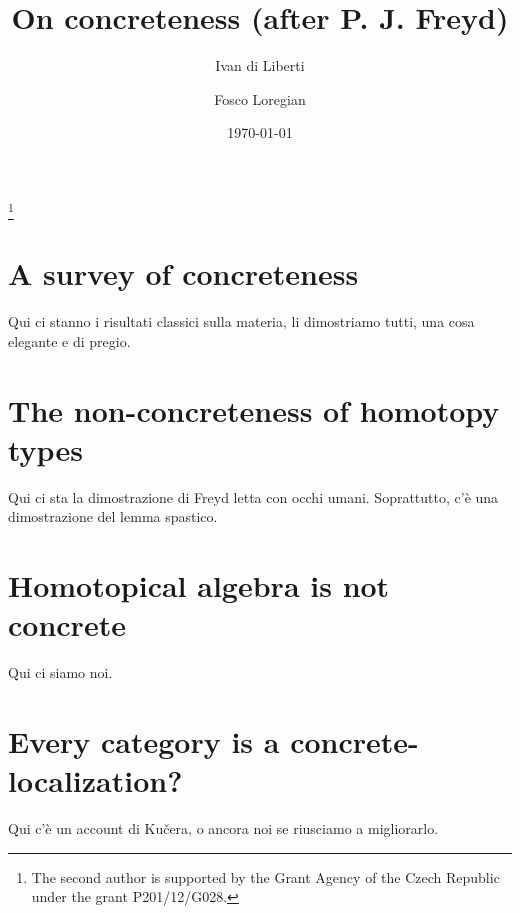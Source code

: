 \documentclass[a4paper,11pt]{amsart}
\begin{document}
\title{On concreteness (after P\@. J\@. Freyd)}

\author{Ivan di Liberti}
\address{%
$^\dag$Department of Mathematics and Statistics\newline
Masaryk University, Faculty of Sciences\newline
Kotl\'{a}\v{r}sk\'{a} 2, 611 37 Brno, Czech Republic\newline
\href{mailto:diliberti@math.muni.cz}{\sf diliberti@math.muni.cz}%
}
\author{Fosco Loregian}
\address{%
$^\dag$Department of Mathematics and Statistics\newline
Masaryk University, Faculty of Sciences\newline
Kotl\'{a}\v{r}sk\'{a} 2, 611 37 Brno, Czech Republic\newline
\href{mailto:loregianf@math.muni.cz}{\sf loregianf@math.muni.cz}
}
\thanks{The second author is supported by the Grant Agency of the Czech Republic under the grant \textsc{P}201/12/\textsc{G}028.}

\date{\today}
\maketitle 

\begin{abstract}

\end{abstract}
\section{A survey of concreteness}
Qui ci stanno i risultati classici sulla materia, li dimostriamo tutti, una cosa elegante e di pregio.
\section{The non-concreteness of homotopy types}
Qui ci sta la dimostrazione di Freyd letta con occhi umani. Soprattutto, c'è una dimostrazione del lemma spastico.
\section{Homotopical algebra is not concrete}
Qui ci siamo noi.
\section{Every category is a concrete-localization?}
Qui c'è un account di Ku\v{c}era, o ancora noi se riusciamo a migliorarlo.
\end{document}
